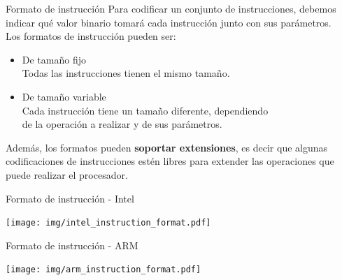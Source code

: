 \documentclass[aspectratio=169]{beamer}
\begin{document}
\begin{frame}[fragile,t]{Formato de instrucción}
    Para codificar un conjunto de instrucciones, debemos indicar qué valor binario tomará cada instrucción junto con sus parámetros.\\
    \bigskip
    Los formatos de instrucción pueden ser:\\
    \begin{itemize}
    \item \textcolor{naranjauca}{De tamaño fijo}\\
    Todas las instrucciones tienen el mismo tamaño.
    \item \textcolor{naranjauca}{De tamaño variable}\\
    Cada instrucción tiene un tamaño diferente, dependiendo\\ de la operación a realizar y de sus parámetros.    
    \end{itemize}
    \bigskip
    Además, los formatos pueden \textbf{soportar extensiones}, es decir que algunas codificaciones de instrucciones estén libres para extender las operaciones que puede realizar el procesador.
\end{frame}

\begin{frame}[fragile]{Formato de instrucción - Intel}
    \begin{center}
     \texttt{[image: img/intel\_instruction\_format.pdf]}
    \end{center}
\end{frame}

\begin{frame}[fragile]{Formato de instrucción - ARM}
    \begin{center}
     \texttt{[image: img/arm\_instruction\_format.pdf]}
    \end{center}
\end{frame}
\end{document}

